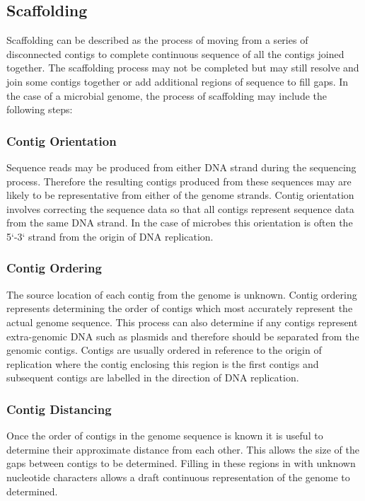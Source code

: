 \documentclass[10pt]{bmc_article}
\newenvironment{bmcformat}{\begin{raggedright}\baselineskip20pt\sloppy\setboolean{publ}{false}}{\end{raggedright}\baselineskip20pt\sloppy}
\begin{document}
\begin{bmcformat}
\subsection*{Scaffolding} %

Scaffolding can be described as the process of moving from a series of
disconnected contigs to complete continuous sequence of all the contigs joined
together. The scaffolding process may not be completed but may still resolve
and join some contigs together or add additional regions of sequence to fill
gaps. In the case of a microbial genome, the process of scaffolding may
include the following steps:

\subsubsection*{Contig Orientation} %

Sequence reads may be produced from either DNA strand during the sequencing
process. Therefore the resulting contigs produced from these sequences may are
likely to be representative from either of the genome strands. Contig
orientation involves correcting the sequence data so that all contigs
represent sequence data from the same DNA strand. In the case of microbes this
orientation is often the 5`-3` strand from the origin of DNA replication.

\subsubsection*{Contig Ordering} %

The source location of each contig from the genome is unknown. Contig ordering
represents determining the order of contigs which most accurately represent
the actual genome sequence. This process can also determine if any contigs
represent extra-genomic DNA such as plasmids and therefore should be separated
from the genomic contigs. Contigs are usually ordered in reference to the
origin of replication where the contig enclosing this region is the first
contigs and subsequent contigs are labelled in the direction of DNA
replication.

\subsubsection*{Contig Distancing} %

Once the order of contigs in the genome sequence is known it is useful to
determine their approximate distance from each other. This allows the size of
the gaps between contigs to be determined. Filling in these regions in with
unknown nucleotide characters allows a draft continuous representation of the
genome to determined.


\end{bmcformat}
\end{document}
